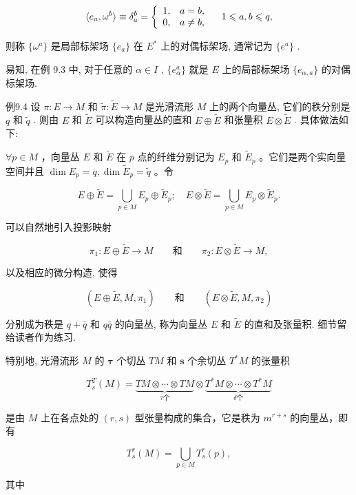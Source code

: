 $$
\langle e _ {a}, \omega^ {b} \rangle \equiv \delta_ {a} ^ {b} = \left\{ \begin{array}{l l} 1, & a = b, \\ 0, & a \neq b, \end{array} \right. \quad 1 \leqslant a, b \leqslant q,
$$

则称  $\{\omega^a\}$  是局部标架场  $\{e_a\}$  在  $E^{*}$  上的对偶标架场, 通常记为  $\{e^a\}$ .

易知, 在例 9.3 中, 对于任意的  $\alpha \in I$ ,  $\{e_{\alpha}^{a}\}$  就是  $E$  上的局部标架场  $\{e_{\alpha, a}\}$  的对偶标架场.

例9.4 设  $\pi : E \to M$  和  $\tilde{\pi} : \tilde{E} \to M$  是光滑流形  $M$  上的两个向量丛, 它们的秩分别是  $q$  和  $\tilde{q}$ . 则由  $E$  和  $\tilde{E}$  可以构造向量丛的直和  $E \oplus \tilde{E}$  和张量积  $E \otimes \tilde{E}$ . 具体做法如下:

$\forall p \in M$ ，向量丛  $E$  和  $\tilde{E}$  在  $p$  点的纤维分别记为  $E_p$  和  $\tilde{E}_p$ 。它们是两个实向量空间并且  $\dim E_p = q, \dim \tilde{E}_p = \tilde{q}$ 。令

$$
E \oplus \tilde {E} = \bigcup_ {p \in M} E _ {p} \oplus \tilde {E} _ {p}; \quad E \otimes \tilde {E} = \bigcup_ {p \in M} E _ {p} \otimes \tilde {E} _ {p}.
$$

可以自然地引入投影映射

$$
\pi_ {1}: E \oplus \tilde {E} \to M \qquad {\text {和}} \qquad \pi_ {2}: E \otimes \tilde {E} \to M,
$$

以及相应的微分构造, 使得

$$
(E \oplus \tilde {E}, M, \pi_ {1}) \qquad {\text {和}} \qquad (E \otimes \tilde {E}, M, \pi_ {2})
$$

分别成为秩是  $q + \bar{q}$  和  $q\bar{q}$  的向量丛, 称为向量丛  $E$  和  $\tilde{E}$  的直和及张量积. 细节留给读者作为练习.

特别地, 光滑流形  $M$  的  $\pmb{\tau}$  个切丛  $TM$  和  $\boldsymbol{s}$  个余切丛  $T^{*}M$  的张量积

$$
T _ {s} ^ {T} (M) = \underbrace {T M \otimes \cdots \otimes T M} _ {\tau \text {个}} \otimes \underbrace {T ^ {*} M \otimes \cdots \otimes T ^ {*} M} _ {\delta \text {个}}
$$

是由  $M$  上在各点处的  $(r,s)$  型张量构成的集合，它是秩为  $m^{r + s}$  的向量丛，即有

$$
T _ {s} ^ {r} (M) = \bigcup_ {p \in M} T _ {s} ^ {r} (p),
$$

其中


